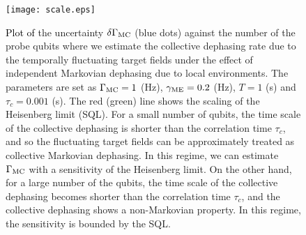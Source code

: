 \documentclass[prl,twocolumn,superscriptaddress]{revtex4}
\begin{document}
  \begin{figure}[h!] 
\begin{center}
\texttt{[image: scale.eps]} 
\caption{
 \textcolor{black}{Plot of}
 the uncertainty $\delta \Gamma _{\rm{MC}}$ (blue dots)
 against the
 number of the probe qubits 
 where we estimate
 the collective dephasing rate due to the temporally fluctuating target fields
  under the effect of
 independent Markovian dephasing due to local environments. 
 The parameters are set as $\Gamma _{\rm{MC}}=1$ (Hz),
 $\gamma _{\rm{ME}}=0.2$ (Hz), $T=1$ (s) and
 $\tau _c=0.001$ (s). The red (green) line shows the scaling of the Heisenberg limit (SQL).
 For a small number of qubits, the time scale of the collective
 dephasing is shorter than the correlation time $\tau _c$, and so the
 fluctuating target fields can be approximately treated as collective Markovian dephasing. In
 this regime, we can estimate $\Gamma _{\rm{MC}}$ with a sensitivity of
 the Heisenberg limit.
 On
 the other hand, for a large number of the qubits, the time scale of the
 collective dephasing becomes shorter than the correlation time $\tau _c$, and the
 collective dephasing shows a non-Markovian property. In this regime,
 the sensitivity is bounded by the SQL.
 }
 \label{scale}
\end{center}
\end{figure}
\end{document}
